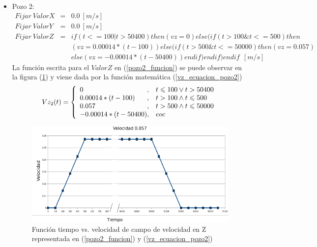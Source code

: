 \documentclass[10pt,a4paper,final]{article}
\begin{document}
\begin{itemize}
\item Pozo 2:
\begin{eqnarray} \label{pozo2_funcion}
\nonumber
Fijar~ValorX&=&0.0~[m/s]\\
\nonumber
Fijar~ValorY&=&0.0~[m/s]\\
Fijar~ValorZ&=& if(t<=100 | t>50400) then(vz=0)else(if(t>100 \& t<=500)then\\
\nonumber
&&(vz=0.00014*(t-100))else(if(t>500 \& t<=50000)then(vz=0.057)\\&&
\nonumber
else(vz=-0.00014*(t-50400))endif)endif)endif~~[m/s]
\end{eqnarray}
La función escrita para el $ValorZ$ en (\ref{pozo2_funcion}) se puede observar en la figura (\ref{grafica1_0057})  y viene dada por la función matemática (\ref{vz_ecuacion_pozo2})
%
\begin{equation}\label{vz_ecuacion_pozo2}
Vz_2(t) = \left\{
\begin{array}{l@{,\quad}l}
0 & t \leqslant 100\vee t > 50400 \\
0.00014*(t-100) & t > 100 \wedge t \leqslant 500 \\
0.057 & t > 500 \wedge t \leqslant 50000 \\
-0.00014*(t-50400) & eoc
\end{array}
\right.
\end{equation}
%

\begin{figure}[tbhp]
\centerline{\includegraphics[scale=0.6]{graficas/0057}}
\caption{Función tiempo vs. velocidad de campo de velocidad en Z representada en (\ref{pozo2_funcion}) y (\ref{vz_ecuacion_pozo2})}
\label{grafica1_0057}
\end{figure}

\end{itemize}
\end{document}
